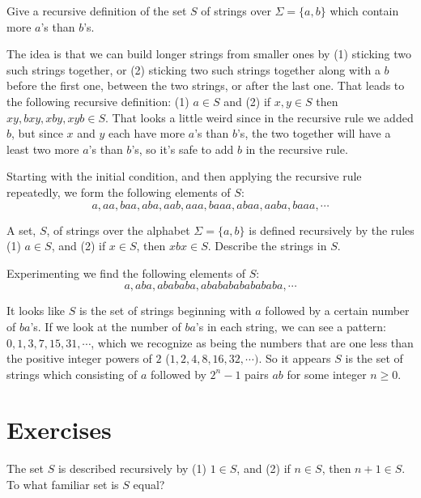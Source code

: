 \begin{exmp} 
Give a recursive definition of the set  $S$ of strings 
over $\Sigma = \{ a,b\}$ which contain more $a$'s than $b$'s.

The idea is that we can build longer strings from smaller ones by
(1) sticking two such strings together, or (2) sticking two such
strings together along with a $b$ before the first one, between the
two strings, or after the last one. That leads to the following
recursive definition:
(1) $a\in S$ and (2) if $x,y\in S$ then $xy, bxy, xby,xyb\in S$.
That looks a little weird since in the recursive rule we added
$b$, but since $x$ and $y$ each have more $a$'s than $b$'s, the
two together will have a least two more $a$'s than $b$'s, so it's
safe to add $b$ in the recursive rule. 

Starting with the initial condition, and then applying the recursive rule
repeatedly, we form the following elements of $S$:
$$
a, aa, baa, aba, aab, aaa, baaa, abaa, aaba, baaa,\cdots
$$
\end{exmp}


\begin{exmp}
A set, $S$,  of strings over the alphabet 
$\Sigma = \{ a,b\}$ is defined recursively by the rules
(1) $a\in S$, and (2) if $x\in S$, then $xbx\in S$. Describe
the strings in $S$.

Experimenting we find the following elements of $S$:
$$
a, aba, abababa, abababababababa, \cdots
$$

It looks like $S$ is the set of strings beginning with $a$ followed by
a certain  number of $ba$'s. If we look at the number of $ba$'s
in each string, we can see a pattern: $0,1,3,7,15,31,\cdots$,
which we recognize as being the numbers that are one less than
the positive integer powers of $2$ ($1,2,4,8,16,32,\cdots)$.
So it appears $S$ is the set of strings which consisting of $a$ followed
by $2^n-1$ pairs $ab$ for some integer $n\geq 0$.
\end{exmp}


\clearpage
\section{Exercises}

\begin{exer}
The set $S$ is described recursively by (1) $1\in S$, and (2) if $n\in S$, then $n+1\in S$.\\
To what familiar set is $S$ equal? 
\end{exer}

